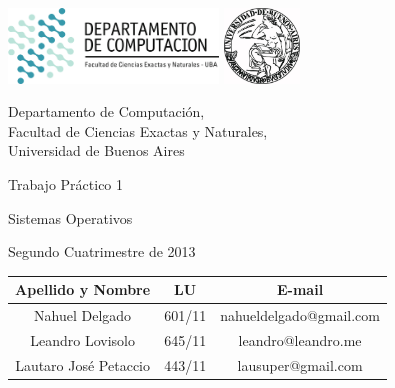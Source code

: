 \documentclass[a4paper,10pt,twoside]{article}
\begin{document}


\thispagestyle{caratula}

\begin{center}

\includegraphics[height=2cm]{DC.png} 
\hfill
\includegraphics[height=2cm]{UBA.jpg} 

\vspace{2cm}

Departamento de Computación,\\
Facultad de Ciencias Exactas y Naturales,\\
Universidad de Buenos Aires

\vspace{4cm}

\begin{Huge}
Trabajo Práctico 1
\end{Huge}

\vspace{0.5cm}

\begin{Large}
Sistemas Operativos
\end{Large}

\vspace{1cm}

Segundo Cuatrimestre de 2013

\vspace{4cm}

\begin{tabular}{|c|c|c|}
\hline
Apellido y Nombre & LU & E-mail\\
\hline
Nahuel Delgado        & 601/11 & nahueldelgado@gmail.com\\
Leandro Lovisolo      & 645/11 & leandro@leandro.me\\
Lautaro José Petaccio & 443/11 & lausuper@gmail.com\\
\hline
\end{tabular}

\end{center}
\end{document}
